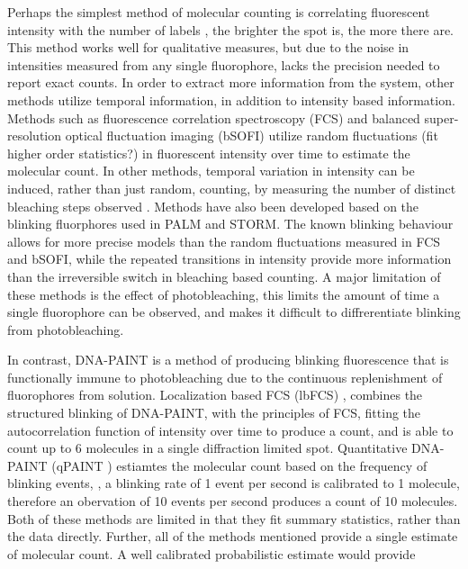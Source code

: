 Perhaps the simplest method of molecular counting is correlating fluorescent
  intensity with the number of labels \cite{schmied_2012, tolar_2005}, \ie the brighter the spot is, the more there are.
  This method works well for qualitative measures, but due to the noise in intensities 
  measured from any single fluorophore, lacks the precision needed to report exact counts.
  In order to extract more information from the system, other methods utilize temporal information, 
  in addition to intensity based information. 
  Methods such as fluorescence correlation spectroscopy (FCS) \cite{otsuka_2023, wachsmuth_2015, politi_2018} and 
  balanced super-resolution optical fluctuation imaging (bSOFI) \cite{geissbuehler_2012}
  utilize random fluctuations (fit higher order statistics?) in fluorescent intensity over time to estimate the molecular count.
  In other methods, temporal variation in intensity can be induced, rather than just random, \ie
  counting, by measuring the number of distinct bleaching steps observed \cite{ulbrich_2007, jain_2011}.
  Methods have also been developed based on the blinking fluorphores used in PALM and STORM. 
  The known blinking behaviour allows for more precise models than the random fluctuations measured in FCS and bSOFI, while the 
  repeated transitions in intensity provide more information than the irreversible switch in bleaching based counting.
  \cite{sengupta_pcPALM_2011, lee_counting_2012}
  \cite{patel_blinking_2021}
  \cite{rollins_stochastic_2015, nino_2017}
  A major limitation of these methods is the effect of photobleaching, this limits the amount of time
  a single fluorophore can be observed, and makes it difficult to diffrerentiate blinking from photobleaching.


In contrast, DNA-PAINT \cite{schnitzbauer_2017} is a method of producing blinking fluorescence that is functionally
    immune to photobleaching due to the continuous replenishment of fluorophores from solution.
    Localization based FCS (lbFCS) \cite{stein_2021}, combines the structured blinking of DNA-PAINT, with the 
    principles of FCS, fitting the autocorrelation function of intensity over time to produce a count,
    and is able to count up to 6 molecules in a single diffraction limited spot.
    Quantitative DNA-PAINT (qPAINT \cite{jungmann_2016}) estiamtes the molecular count based on the frequency of blinking events, \ie, 
    a blinking rate of 1 event per second is calibrated to 1 molecule, therefore an obervation of 10 events per second
    produces a count of 10 molecules.
    Both of these methods are limited in that they fit summary statistics,
    rather than the data directly. 
    Further, all of the methods mentioned provide a single estimate of molecular count.
    A well calibrated probabilistic estimate would provide 
    
